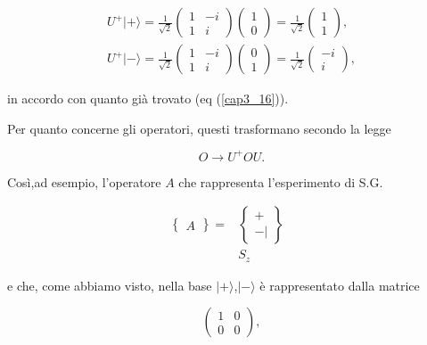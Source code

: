\begin{equation}
\begin{array}{r}
U^+| + \rangle =\frac{1}{\sqrt{2}}
\begin{pmatrix}
1 & -i\\
1 & i
\end{pmatrix}
\begin{pmatrix}
1\\
0
\end{pmatrix}=
\frac{1}{\sqrt{2}}
\begin{pmatrix}
1\\
1
\end{pmatrix} ,\\
U^+| - \rangle =\frac{1}{\sqrt{2}}
\begin{pmatrix}
1 & -i\\
1 & i
\end{pmatrix}
\begin{pmatrix}
0\\
1
\end{pmatrix}=
\frac{1}{\sqrt{2}}
\begin{pmatrix}
-i\\
i
\end{pmatrix} ,
\end{array}
\end{equation}

in accordo con quanto già trovato (eq (\ref{cap3_16})).

Per quanto concerne gli operatori, questi trasformano secondo la legge

\begin{equation}
O \rightarrow U^+OU .
\end{equation}

Così,ad esempio, l'operatore $A$ che rappresenta l'esperimento di S.G.

\begin{eqnarray}
\begin{Bmatrix}
 A
\end{Bmatrix}
=
&\begin{Bmatrix}
 +  \\ - |  
\end{Bmatrix}& \\
&S_z&
\end{eqnarray}

e che, come abbiamo visto, nella base $| + \rangle $,$| - \rangle $ è rappresentato dalla matrice

\begin{equation}
\begin{pmatrix}
1 & 0\\
0 & 0
\end{pmatrix} ,
\end{equation}


